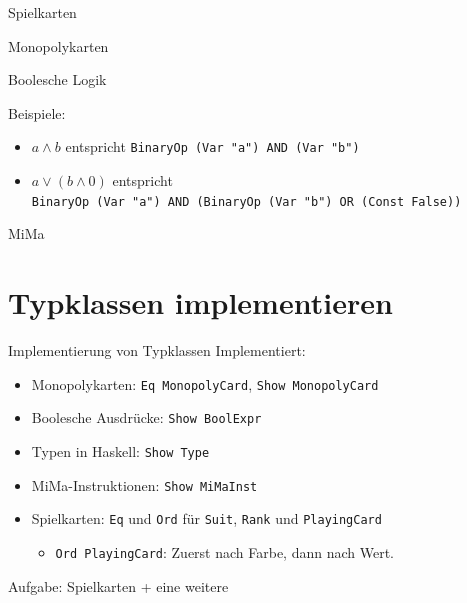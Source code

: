 \documentclass{beamer}
\begin{document}
\begin{frame}{Spielkarten}
\end{frame}

\begin{frame}{Monopolykarten}
\end{frame}

\begin{frame}{Boolesche Logik}

  \vfill

  Beispiele:
  \begin{itemize}
    \item $a \wedge b$ entspricht \texttt{BinaryOp (Var "{}a"{}) AND (Var "{}b"{})}
    \item $a \vee (b \wedge 0)$ entspricht\\
          \texttt{BinaryOp (Var "{}a"{}) AND (BinaryOp (Var "{}b"{}) OR (Const False))}
  \end{itemize}
\end{frame}

\begin{frame}{MiMa}
\end{frame}

\section{Typklassen implementieren}

\begin{frame}{Implementierung von Typklassen}
  Implementiert:

  \vfill

  \begin{itemize}
    \item Monopolykarten: \texttt{Eq MonopolyCard}, \texttt{Show MonopolyCard}
    \item Boolesche Ausdrücke: \texttt{Show BoolExpr}
    \item Typen in Haskell: \texttt{Show Type}
    \item MiMa-Instruktionen: \texttt{Show MiMaInst}
    \item Spielkarten: \texttt{Eq} und \texttt{Ord} für \texttt{Suit}, \texttt{Rank} und \texttt{PlayingCard}
    \begin{itemize}
      \item \texttt{Ord PlayingCard}: Zuerst nach Farbe, dann nach Wert.
    \end{itemize}
  \end{itemize}

  \vfill
  
  Aufgabe: Spielkarten + eine weitere
\end{frame}
\end{document}
